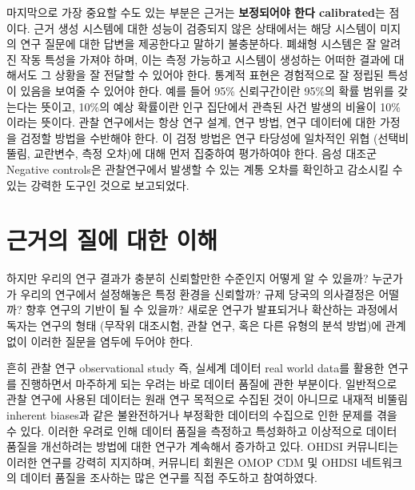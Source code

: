 \documentclass[10.5pt]{book}
\theoremstyle{definition}
\theoremstyle{definition}
\theoremstyle{definition}
\theoremstyle{remark}
\begin{document}
마지막으로 가장 중요할 수도 있는 부분은 근거는 \textbf{보정되어야 한다
calibrated}는 점이다. 근거 생성 시스템에 대한 성능이 검증되지 않은
상태에서는 해당 시스템이 미지의 연구 질문에 대한 답변을 제공한다고
말하기 불충분하다. 폐쇄형 시스템은 잘 알려진 작동 특성을 가져야 하며,
이는 측정 가능하고 시스템이 생성하는 어떠한 결과에 대해서도 그 상황을 잘
전달할 수 있어야 한다. 통계적 표현은 경험적으로 잘 정립된 특성이 있음을
보여줄 수 있어야 한다. 예를 들어 95\% 신뢰구간이란 95\%의 확률 범위를
갖는다는 뜻이고, 10\%의 예상 확률이란 인구 집단에서 관측된 사건 발생의
비율이 10\%이라는 뜻이다. 관찰 연구에서는 항상 연구 설계, 연구 방법,
연구 데이터에 대한 가정을 검정할 방법을 수반해야 한다. 이 검정 방법은
연구 타당성에 일차적인 위협 (선택비뚤림, 교란변수, 측정 오차)에 대해
먼저 집중하여 평가하여야 한다. 음성 대조군 Negative controls은
관찰연구에서 발생할 수 있는 계통 오차를 확인하고 감소시킬 수 있는 강력한
도구인 것으로 보고되었다.
\citep{schuemie_2016, schuemie_2018, schuemie_2018b}

\section{근거의 질에 대한 이해}\label{---}

하지만 우리의 연구 결과가 충분히 신뢰할만한 수준인지 어떻게 알 수
있을까? 누군가가 우리의 연구에서 설정해놓은 특정 환경을 신뢰할까? 규제
당국의 의사결정은 어떨까? 향후 연구의 기반이 될 수 있을까? 새로운 연구가
발표되거나 확산하는 과정에서 독자는 연구의 형태 (무작위 대조시험, 관찰
연구, 혹은 다른 유형의 분석 방법)에 관계없이 이러한 질문을 염두에 두어야
한다.  

흔히 관찰 연구 observational study 즉, 실세계 데이터 real world data를
활용한 연구를 진행하면서 마주하게 되는 우려는 바로 데이터 품질에 관한
부분이다. \citep{botsis2010secondary, hersh2013caveats, sherman2016real}
일반적으로 관찰 연구에 사용된 데이터는 원래 연구 목적으로 수집된 것이
아니므로 내재적 비뚤림 inherent biases과 같은 불완전하거나 부정확한
데이터의 수집으로 인한 문제를 겪을 수 있다. 이러한 우려로 인해 데이터
품질을 측정하고 특성화하고 이상적으로 데이터 품질을 개선하려는 방법에
대한 연구가 계속해서 증가하고 있다.
\citep{kahn2012pragmatic, liaw2013towards, weiskopf_2013} OHDSI
커뮤니티는 이러한 연구를 강력히 지지하며, 커뮤니티 회원은 OMOP CDM 및
OHDSI 네트워크의 데이터 품질을 조사하는 많은 연구를 직접 주도하고
참여하였다.
\citep{huser_multisite_2016, kahn_transparent_2015, callahan2017comparison, yoon_2016}
 
\end{document}
